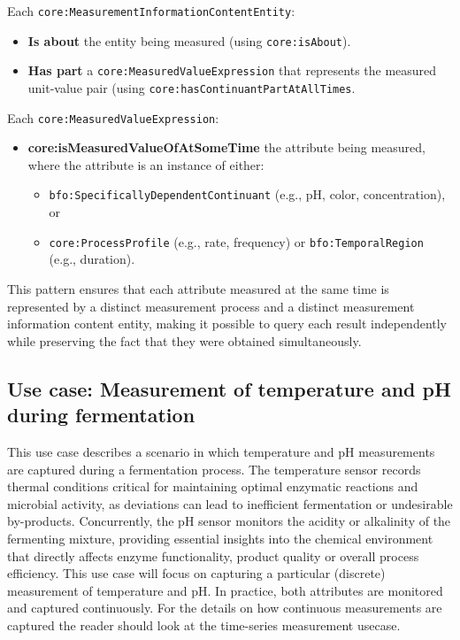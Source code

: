 Each \texttt{core:MeasurementInformationContentEntity}:

\begin{itemize}
    \item \textbf{Is about} the entity being measured (using \texttt{core:isAbout}).
    \item \textbf{Has part} a \texttt{core:MeasuredValueExpression} that represents the measured unit-value pair (using \texttt{core:hasContinuantPartAtAllTimes}.
\end{itemize}

Each \texttt{core:MeasuredValueExpression}:

\begin{itemize}
    \item \textbf{core:isMeasuredValueOfAtSomeTime} the attribute being measured, where the attribute is an instance of either:
    \begin{itemize}
        \item \texttt{bfo:SpecificallyDependentContinuant} (e.g., pH, color, concentration), or
        \item \texttt{core:ProcessProfile} (e.g., rate, frequency) or \texttt{bfo:TemporalRegion} (e.g., duration).
    \end{itemize}
\end{itemize}

This pattern ensures that each attribute measured at the same time is represented by a distinct measurement process and a distinct measurement information content entity, making it possible to query each result independently while preserving the fact that they were obtained simultaneously.

\subsection{Use case: Measurement of temperature and pH during fermentation}
This use case describes a scenario in which temperature and pH measurements are captured during a fermentation process. The temperature sensor records thermal conditions critical for maintaining optimal enzymatic reactions and microbial activity, as deviations can lead to inefficient fermentation or undesirable by-products. Concurrently, the pH sensor monitors the acidity or alkalinity of the fermenting mixture, providing essential insights into the chemical environment that directly affects enzyme functionality, product quality or overall process efficiency.
This use case will focus on capturing a particular (discrete) measurement of temperature and pH. In practice, both attributes are monitored and captured continuously. For the details on how continuous measurements are captured the reader should look at the time-series measurement usecase.


